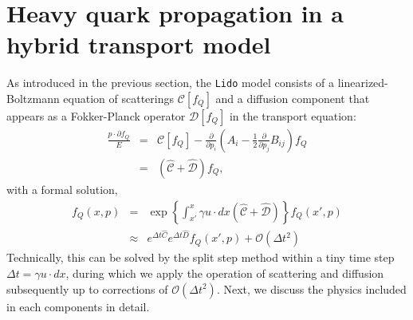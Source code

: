 \section{Heavy quark propagation in a hybrid transport model}\label{section:model}
As introduced in the previous section, the {\tt Lido} model consists of a linearized-Boltzmann equation of scatterings $\mathcal{C}[f_Q]$ and a diffusion component that appears as a Fokker-Planck operator $\mathcal{D}[f_Q]$ in the transport equation:
\begin{eqnarray}
\nonumber
  \frac{p \cdot \partial f_Q}{E}  &=& 
\mathcal{C}[f_Q] - \frac{\partial}{\partial p_i}\left(A_i -\frac{1}{2}\frac{\partial}{\partial p_j}B_{ij} \right) f_Q \\
  &=& 
\left( \mathcal{\hat{C}} + \mathcal{\hat{D}} \right) f_Q,
\end{eqnarray}
with a formal solution,
\begin{eqnarray}
\nonumber
f_Q(x,p) &=& \exp\left\{ \int_{x'}^x \gamma u \cdot dx \left( \mathcal{\hat{C}} + \mathcal{\hat{D}} \right) \right\} f_Q(x',p)\\
&\approx & e^{\Delta t \hat{C}}e^{\Delta t \hat{D}} f_Q(x', p) + \mathcal{O}(\Delta t^2)
\end{eqnarray}
Technically, this can be solved by the split step method within a tiny time step $\Delta t = \gamma u \cdot dx$, during which we apply the operation of scattering and diffusion subsequently up to corrections of $\mathcal{O}(\Delta t^2)$.
Next, we discuss the physics included in each components in detail. 

